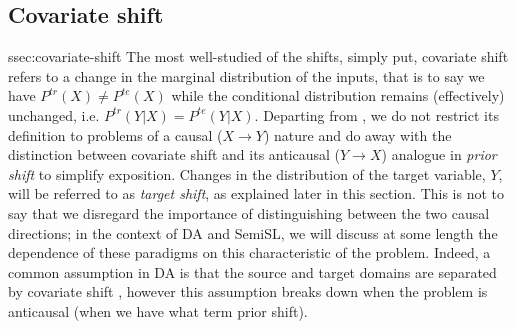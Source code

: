 \subsection{Covariate shift}{ssec:covariate-shift}\label{ssec:covariate-shift}
The most well-studied of the shifts, simply put, covariate shift refers to a change in the marginal
distribution of the inputs, that is to say we have \(P^{tr}(X) \neq P^{te}(X) \) while the
conditional distribution remains (effectively) unchanged, i.e. \)\(P^{tr}(Y|X) = P^{te}(Y|X) \).
%
Departing from \cite{moreno2012unifying}, we do not restrict its definition to problems of a causal
(\( X \to Y\)) nature and do away with the distinction between covariate shift and its anticausal
(\( Y \to X \)) analogue in \emph{prior shift} to simplify exposition.
%
Changes in the distribution of the target variable, \(Y\), will be referred to as \emph{target
shift}, as explained later in this section.
%
This is not to say that we disregard the importance of distinguishing between the two causal
directions; in the context of DA and SemiSL, we will discuss at some length the dependence of these
paradigms on this characteristic of the problem.
%
Indeed, a common assumption in DA is that the source and target domains are separated by covariate
shift \cite{david2010impossibility}, however this assumption breaks down when the problem is
anticausal (when we have what \cite{moreno} term prior shift).

